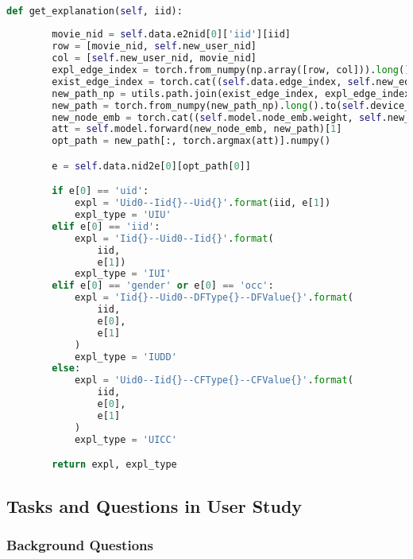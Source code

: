 \begin{lstlisting}[language=Python, caption=get\_explanation]

def get_explanation(self, iid):
        
        movie_nid = self.data.e2nid[0]['iid'][iid]
        row = [movie_nid, self.new_user_nid]
        col = [self.new_user_nid, movie_nid]
        expl_edge_index = torch.from_numpy(np.array([row, col])).long().to(self.device_args['device'])
        exist_edge_index = torch.cat((self.data.edge_index, self.new_edge_index), dim=1)
        new_path_np = utils.path.join(exist_edge_index, expl_edge_index)
        new_path = torch.from_numpy(new_path_np).long().to(self.device_args['device'])
        new_node_emb = torch.cat((self.model.node_emb.weight, self.new_user_emb.weight), dim=0)
        att = self.model.forward(new_node_emb, new_path)[1]
        opt_path = new_path[:, torch.argmax(att)].numpy()

        e = self.data.nid2e[0][opt_path[0]]

        if e[0] == 'uid':
            expl = 'Uid0--Iid{}--Uid{}'.format(iid, e[1])
            expl_type = 'UIU'
        elif e[0] == 'iid':
            expl = 'Iid{}--Uid0--Iid{}'.format(
                iid,
                e[1])
            expl_type = 'IUI'
        elif e[0] == 'gender' or e[0] == 'occ':
            expl = 'Iid{}--Uid0--DFType{}--DFValue{}'.format(
                iid,
                e[0],
                e[1]
            )
            expl_type = 'IUDD'
        else:
            expl = 'Uid0--Iid{}--CFType{}--CFValue{}'.format(
                iid,
                e[0],
                e[1]
            )
            expl_type = 'UICC'

        return expl, expl_type

\end{lstlisting}


\subsection{Tasks and Questions in User Study}
\subsubsection{Background Questions}

